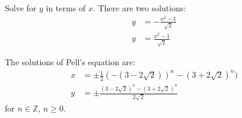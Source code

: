 Solve for $y$ in terms of $x$. There are two solutions:
\begin{align*}
y & = - \frac{x^{2}-1}{\sqrt{2}}
\\
y & = \frac{x^{2}-1}{\sqrt{2}}
\end{align*}

The solutions of Pell's equation are:
\begin{align*}
x & = \pm \frac{1}{2}(-(3-2\sqrt{2}))^{n} - (3+2\sqrt{2})^{n})
\\
y & = \pm \frac{(3-2\sqrt{2})^{n}-(3+2\sqrt{2})^{n}}{2\sqrt{2}}
\end{align*}
for $n\in\mathbb{Z}$, $n\ge0$.
